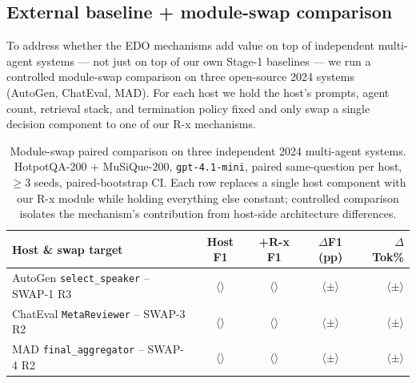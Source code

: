 
\subsection{External baseline + module-swap comparison}
\label{sec:external-swap}

To address whether the EDO mechanisms add value on top of independent multi-agent systems --- not just on top of our own Stage-1 baselines --- we run a controlled module-swap comparison on three open-source 2024 systems (AutoGen, ChatEval, MAD). For each host we hold the host's prompts, agent count, retrieval stack, and termination policy fixed and only swap a single decision component to one of our R-x mechanisms.

\begin{table}[t]
\centering
\small
\setlength{\tabcolsep}{3pt}
\begin{tabular}{@{}lcccr@{}}
\toprule
\textbf{Host \& swap target} & \textbf{Host F1} & \textbf{+R-x F1} & \textbf{$\Delta$F1 (pp)} & \textbf{$\Delta$Tok\%} \\
\midrule
AutoGen \texttt{select\_speaker} -- SWAP-1 R3 & $\langle\rangle$ & $\langle\rangle$ & $\langle\pm\rangle$ & $\langle\pm\rangle$ \\
ChatEval \texttt{MetaReviewer} -- SWAP-3 R2  & $\langle\rangle$ & $\langle\rangle$ & $\langle\pm\rangle$ & $\langle\pm\rangle$ \\
MAD \texttt{final\_aggregator} -- SWAP-4 R2  & $\langle\rangle$ & $\langle\rangle$ & $\langle\pm\rangle$ & $\langle\pm\rangle$ \\
\bottomrule
\end{tabular}
\caption{Module-swap paired comparison on three independent 2024 multi-agent systems. HotpotQA-200 + MuSiQue-200, \texttt{gpt-4.1-mini}, paired same-question per host, $\geq 3$ seeds, paired-bootstrap CI. Each row replaces a single host component with our R-x module while holding everything else constant; controlled comparison isolates the mechanism's contribution from host-side architecture differences.}
\label{tab:external-swap}
\end{table}

